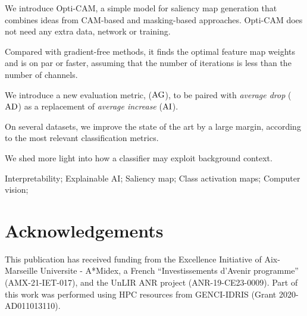 \documentclass[preprint,3p,10pt]{elsarticle}
\begin{document}
\begin{frontmatter}

\begin{highlights}
\item We introduce Opti-CAM, a simple model for saliency map generation that combines ideas from CAM-based and masking-based approaches. Opti-CAM does not need any extra data, network or training.

\item Compared with gradient-free methods, it finds the optimal feature map weights and is on par or faster, assuming that the number of iterations is less than the number of channels.
\item We introduce a new evaluation metric, \emph{\agf} ($\operatorname{AG}$), to be paired with \emph{average drop} ($\operatorname{AD}$) as a replacement of \emph{average increase} ($\operatorname{AI}$).
\item On several datasets,	we improve the state of the art by a large margin,  according to the most relevant classification metrics.
\item We shed more light into how a classifier may exploit background context.
\end{highlights}

\begin{keyword}
Interpretability; Explainable AI; Saliency map; Class activation maps; Computer vision; 
\end{keyword}
\end{frontmatter}











\section*{Acknowledgements}
This publication has received funding from the Excellence Initiative of Aix-Marseille Universite - A*Midex, a French “Investissements d’Avenir programme” (AMX-21-IET-017), and the UnLIR ANR project (ANR-19-CE23-0009). Part of this work was performed using HPC resources from GENCI-IDRIS (Grant 2020-AD011013110).




%
%

% 
% 


% 
\end{document}
